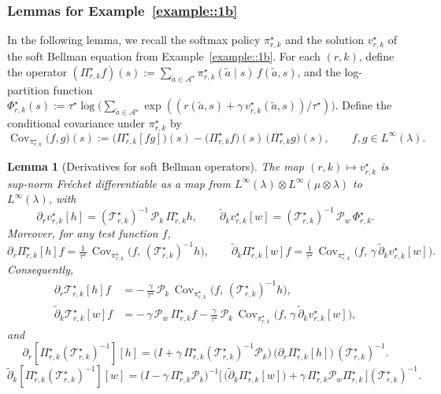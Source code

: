 \documentclass[11pt]{article}
\newcommand{\adk}{\widetilde{\partial}_k}
\theoremstyle{plain}
\newtheorem{lemma}[theorem]{Lemma}
\begin{document}
 



 
 \subsubsection{Lemmas for Example~\ref{example::1b}}

 

In the following lemma, we recall the softmax policy $\pi_{r,k}^\star$ and the solution $v_{r,k}^\star$ of the soft Bellman equation from Example~\ref{example::1b}. For each $(r,k)$, define the operator $(\Pi_{r,k}^\star f)(s) := \sum_{\tilde a \in \mathcal{A}^\star} \pi_{r,k}^\star(\tilde a \mid s)\,f(\tilde a,s)$, and the log-partition function $\Phi_{r,k}^\star(s) := \tau^\star \log\!\big(\sum_{\tilde a \in \mathcal{A}^\star} \exp((r(\tilde a,s) + \gamma\,v_{r,k}^\star(\tilde a,s))/\tau^\star)\big)$. Define the conditional covariance under $\pi_{r,k}^\star$ by
\[
\operatorname{Cov}_{\pi_{r,k}^\star}\!\big(f,g\big)(s)
:= \big(\Pi_{r,k}^\star[fg]\big)(s)
- \big(\Pi_{r,k}^\star f\big)(s)\,\big(\Pi_{r,k}^\star g\big)(s), 
\qquad f,g \in L^\infty(\lambda).
\]

 
 



\begin{lemma}[Derivatives for soft Bellman operators]
\label{lemma::derivSoftBellmanStar}
The map $(r,k) \mapsto v_{r,k}^\star$ is sup-norm Fréchet differentiable as a map from $L^\infty(\lambda) \otimes L^\infty(\mu \otimes \lambda)$ to $L^\infty(\lambda)$, with
\[
\partial_r v_{r,k}^\star[h] = (\mathcal{T}_{r,k}^\star)^{-1}\,\mathcal{P}_k\,\Pi_{r,k}^\star h,
\qquad
\adk v_{r,k}^\star[w] = (\mathcal{T}_{r,k}^\star)^{-1}\,\mathcal{P}_w\,\Phi_{r,k}^\star.
\]
Moreover, for any test function $f$,
\[
\partial_r \Pi_{r,k}^\star[h] f
= \tfrac{1}{\tau^\star}\,
\operatorname{Cov}_{\pi_{r,k}^\star}\!\big(f,\,(\mathcal{T}_{r,k}^\star)^{-1}h\big),
\qquad
\adk \Pi_{r,k}^\star[w] f
= \tfrac{1}{\tau^\star}\,
\operatorname{Cov}_{\pi_{r,k}^\star}\!\big(f,\,\gamma\,\adk v_{r,k}^\star[w]\big).
\]
Consequently,
\[
\begin{aligned}
\partial_r \mathcal{T}_{r,k}^\star[h] f
&= -\,\tfrac{\gamma}{\tau^\star}\,
\mathcal{P}_k\,
\operatorname{Cov}_{\pi_{r,k}^\star}\!\big(f,\,(\mathcal{T}_{r,k}^\star)^{-1}h\big), \\[6pt]
\adk \mathcal{T}_{r,k}^\star[w] f
&= -\,\gamma\,\mathcal{P}_w\,\Pi_{r,k}^\star f
- \tfrac{\gamma}{\tau^\star}\,
\mathcal{P}_k\,
\operatorname{Cov}_{\pi_{r,k}^\star}\!\big(f,\,\gamma\,\adk v_{r,k}^\star[w]\big),
\end{aligned}
\]
and
\[
\partial_r \!\left[ \Pi_{r,k}^\star (\mathcal{T}_{r,k}^\star)^{-1}\right][h]
= \Big(I + \gamma\,\Pi_{r,k}^\star (\mathcal{T}_{r,k}^\star)^{-1}\mathcal{P}_k\Big)\,
\big(\partial_r \Pi_{r,k}^\star[h]\big)\,(\mathcal{T}_{r,k}^\star)^{-1}.
\]
\[
\adk \!\left[ \Pi_{r,k}^\star (\mathcal{T}_{r,k}^\star)^{-1}\right][w]
= \big(I-\gamma\,\Pi_{r,k}^\star \mathcal{P}_k\big)^{-1}
\Big[\,\big(\adk \Pi_{r,k}^\star[w]\big) + \gamma\,\Pi_{r,k}^\star \mathcal{P}_w \Pi_{r,k}^\star\,\Big]
(\mathcal{T}_{r,k}^\star)^{-1}.
\]
\end{lemma}
\end{document}
